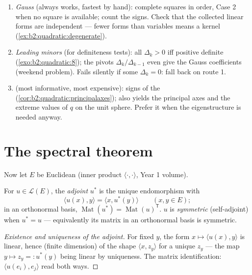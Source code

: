 \begin{method}\label{met:b2:quadratic:signature}
\begin{enumerate}
  \item \emph{Gauss} (always works, fastest by hand): complete
        squares in order, Case 2 when no square is available;
        count the signs. Check that the collected linear forms
        are independent --- fewer forms than variables means a
        kernel (\cref{ex:b2:quadratic:degenerate}).
  \item \emph{Leading minors} (for definiteness tests): all
        $\Delta_k > 0$ iff positive definite
        (\cref{exo:b2:quadratic:8}); the pivots
        $\Delta_k/\Delta_{k-1}$ even give the Gauss
        coefficients (weekend problem). Fails silently if some
        $\Delta_k = 0$: fall back on route 1.
  \item \emph{} (most informative, most expensive):
        signs of the 
        (\cref{cor:b2:quadratic:principalaxes}); also yields
        the principal axes and the extreme values of $q$ on
        the unit sphere. Prefer it when the eigenstructure is
        needed anyway.
\end{enumerate}
\end{method}

\section{The spectral theorem}

Now let $E$ be Euclidean (inner product $\langle\cdot,\cdot\rangle$,
Year 1 volume).

\begin{definition}\label{def:b2:quadratic:adjoint}
For $u \in \mathcal{L}(E)$, the \emph{adjoint}
$u^*$ is the unique endomorphism with
\[
\langle u(x), y\rangle = \langle x, u^*(y)\rangle
\qquad (x, y \in E);
\]
in an orthonormal basis, $\operatorname{Mat}(u^*) =
\operatorname{Mat}(u)^{\mathsf T}$. $u$ is
\emph{symmetric} (self-adjoint) when
$u^* = u$ --- equivalently its matrix in an orthonormal basis is
symmetric.
\end{definition}

\begin{proof}[Existence and uniqueness of the adjoint]
For fixed $y$, the form $x \mapsto \langle u(x), y\rangle$ is
linear, hence (finite dimension) of the shape $\langle x,
z_y\rangle$ for a unique $z_y$ --- the map $y \mapsto z_y =:
u^*(y)$ being linear by uniqueness. The matrix identification:
$\langle u(e_i), e_j\rangle$ read both ways.
\end{proof}

